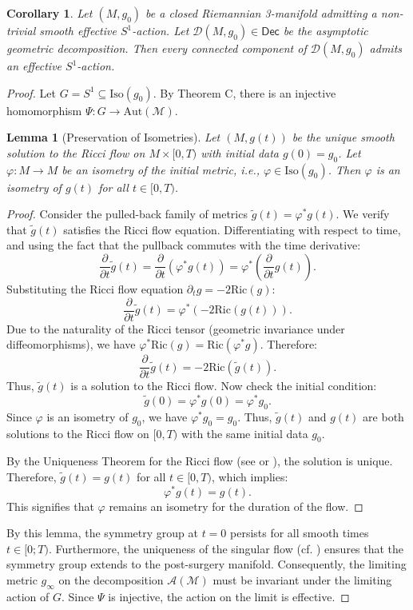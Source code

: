 \documentclass[11pt]{article}
\newtheorem{lemma}[theorem]{Lemma}
\newtheorem{corollary}[theorem]{Corollary}
\newcommand{\Dec}{\mathsf{Dec}}
\begin{document}
\begin{corollary}
Let $(M, g_0)$ be a closed Riemannian 3-manifold admitting a non-trivial smooth effective $S^1$-action. Let $\mathcal{D}(M, g_0) \in \Dec$ be the asymptotic geometric decomposition. Then every connected component of $\mathcal{D}(M, g_0)$ admits an effective $S^1$-action.
\end{corollary}

\begin{proof}
Let $G = S^1 \subseteq \mathrm{Iso}(g_0)$. By Theorem C, there is an injective homomorphism $\Psi: G \to \mathrm{Aut}(\mathcal{M})$.


\begin{lemma}[Preservation of Isometries] \label{lemma:iso_preservation}
Let $(M, g(t))$ be the unique smooth solution to the Ricci flow on $M \times [0, T)$ with initial data $g(0) = g_0$. Let $\varphi: M \to M$ be an isometry of the initial metric, i.e., $\varphi \in \mathrm{Iso}(g_0)$. Then $\varphi$ is an isometry of $g(t)$ for all $t \in [0, T)$.
\end{lemma}
\begin{proof}
Consider the pulled-back family of metrics $\tilde{g}(t) = \varphi^* g(t)$. We verify that $\tilde{g}(t)$ satisfies the Ricci flow equation. Differentiating with respect to time, and using the fact that the pullback commutes with the time derivative:
\[
\frac{\partial}{\partial t} \tilde{g}(t) = \frac{\partial}{\partial t} (\varphi^* g(t)) = \varphi^* \left( \frac{\partial}{\partial t} g(t) \right).
\]
Substituting the Ricci flow equation $\partial_t g = -2\mathrm{Ric}(g)$:
\[
\frac{\partial}{\partial t} \tilde{g}(t) = \varphi^* \left( -2\mathrm{Ric}(g(t)) \right).
\]
Due to the naturality of the Ricci tensor (geometric invariance under diffeomorphisms), we have $\varphi^* \mathrm{Ric}(g) = \mathrm{Ric}(\varphi^* g)$. Therefore:
\[
\frac{\partial}{\partial t} \tilde{g}(t) = -2 \mathrm{Ric}(\tilde{g}(t)).
\]
Thus, $\tilde{g}(t)$ is a solution to the Ricci flow. Now check the initial condition:
\[
\tilde{g}(0) = \varphi^* g(0) = \varphi^* g_0.
\]
Since $\varphi$ is an isometry of $g_0$, we have $\varphi^* g_0 = g_0$. Thus, $\tilde{g}(t)$ and $g(t)$ are both solutions to the Ricci flow on $[0, T)$ with the same initial data $g_0$.

By the Uniqueness Theorem for the Ricci flow (see \cite{DeT83} or \cite{Ham82}), the solution is unique. Therefore, $\tilde{g}(t) = g(t)$ for all $t \in [0, T)$, which implies:
\[
\varphi^* g(t) = g(t).
\]
This signifies that $\varphi$ remains an isometry for the duration of the flow.
\end{proof}
By this lemma,  the symmetry group at $t=0$ persists for all smooth times $t\in [0;T)$. Furthermore, the uniqueness of the singular flow (cf. \cite[Theorem 1.3]{BK19}) ensures that the symmetry group extends to the post-surgery manifold.
Consequently, the limiting metric $g_\infty$ on the decomposition $\mathcal{A}(\mathcal{M})$ must be invariant under the limiting action of $G$. Since $\Psi$ is injective, the action on the limit is effective.
\end{proof}
\end{document}
